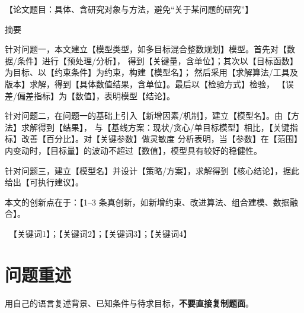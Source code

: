 \documentclass[12pt,a4paper,fontset=windows]{ctexart}
\begin{document}
\begin{center}
  {\heiti 【论文题目：具体、含研究对象与方法，避免“关于某问题的研究”】}
\end{center}

\vspace{0.6em}
\begin{center}
  {\heiti 摘\quad 要}
\end{center}
\vspace{0.3em}

针对问题一，本文建立【模型类型，如多目标混合整数规划】模型。首先对【数据/条件】进行【预处理/分析】，
得到【关键量，含单位】；其次以【目标函数】为目标、以【约束条件】为约束，构建【模型名】；
然后采用【求解算法/工具及版本】求解，得到【具体数值结果，含单位】。最后以【检验方式】检验，
【误差/偏差指标】为【数值】，表明模型【结论】。

针对问题二，在问题一的基础上引入【新增因素/机制】，建立【模型名】。由【方法】求解得到【结果】，
与【基线方案：现状/贪心/单目标模型】相比，【关键指标】改善【百分比】。对【关键参数】做灵敏度
分析表明，当【参数】在【范围】内变动时，【目标量】的波动不超过【数值】，模型具有较好的稳健性。

针对问题三，建立【模型名】并设计【策略/方案】，求解得到【核心结论】，据此给出【可执行建议】。

本文的创新点在于：【1–3 条真创新，如新增约束、改进算法、组合建模、数据融合】。

\vspace{0.5em}
\ 【关键词1】；【关键词2】；【关键词3】；【关键词4】

\newpage

\section{问题重述}
用自己的语言复述背景、已知条件与待求目标，\textbf{不要直接复制题面}。
\end{document}
